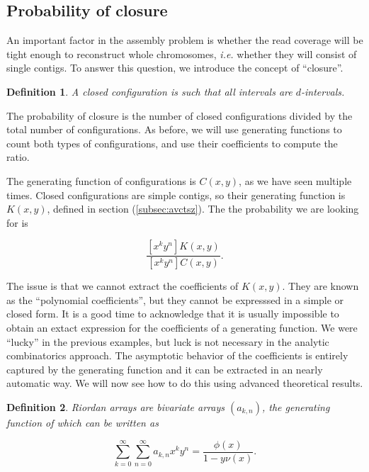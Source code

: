 \documentclass{article}
\newtheorem{definition}{Definition}
\begin{document}
\subsection{Probability of closure}
\label{sec:compass}

An important factor in the assembly problem is whether the read coverage
will be tight enough to reconstruct whole chromosomes, \textit{i.e.}
whether they will consist of single contigs. To answer this question, we
introduce the concept of ``closure''.

\begin{definition}
A closed configuration is such that all intervals are $d$-intervals.
\end{definition}

The probability of closure is the number of closed configurations divided
by the total number of configurations. As before, we will use generating
functions to count both types of configurations, and use their
coefficients to compute the ratio.

The generating function of configurations is $C(x,y)$, as we have seen
multiple times. Closed configurations are simple contigs, so their
generating function is $K(x,y)$, defined in section (\ref{subsec:avctsz}).
The the probability we are looking for is

\begin{equation*}
\frac{[x^ky^n]K(x,y)}{[x^ky^n]C(x,y)}.
\end{equation*}

The issue is that we cannot extract the coefficients of $K(x,y)$. They are
known as the ``polynomial coefficients'', but they cannot be expresssed in
a simple or closed form. It is a good time to acknowledge that it is
usually impossible to obtain an extact expression for the coefficients of
a generating function. We were ``lucky'' in the previous examples, but
luck is not necessary in the analytic combinatorics approach. The
asymptotic behavior of the coefficients is entirely captured by the
generating function and it can be extracted in an nearly automatic way. We
will now see how to do this using advanced theoretical results.

\begin{definition}
Riordan arrays are bivariate arrays $(a_{k,n})$, the generating function
of which can be written as

\begin{equation}
\label{eq:RAGF}
\sum_{k=0}^\infty \sum_{n=0}^\infty a_{k,n} x^k y^n =
\frac{\phi(x)}{1-y \nu(x)}.
\end{equation}
\end{definition}
\end{document}
